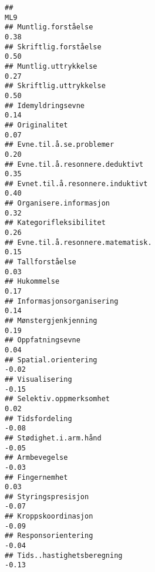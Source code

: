 \documentclass[
]{article}
\begin{document}
\begin{verbatim}
##                                                                                    ML9
## Muntlig.forståelse                                                                0.38
## Skriftlig.forståelse                                                              0.50
## Muntlig.uttrykkelse                                                               0.27
## Skriftlig.uttrykkelse                                                             0.50
## Idemyldringsevne                                                                  0.14
## Originalitet                                                                      0.07
## Evne.til.å.se.problemer                                                           0.20
## Evne.til.å.resonnere.deduktivt                                                    0.35
## Evnet.til.å.resonnere.induktivt                                                   0.40
## Organisere.informasjon                                                            0.32
## Kategorifleksibilitet                                                             0.26
## Evne.til.å.resonnere.matematisk.                                                  0.15
## Tallforståelse                                                                    0.03
## Hukommelse                                                                        0.17
## Informasjonsorganisering                                                          0.14
## Mønstergjenkjenning                                                               0.19
## Oppfatningsevne                                                                   0.04
## Spatial.orientering                                                              -0.02
## Visualisering                                                                    -0.15
## Selektiv.oppmerksomhet                                                            0.02
## Tidsfordeling                                                                    -0.08
## Stødighet.i.arm.hånd                                                             -0.05
## Armbevegelse                                                                     -0.03
## Fingernemhet                                                                      0.03
## Styringspresisjon                                                                -0.07
## Kroppskoordinasjon                                                               -0.09
## Responsorientering                                                               -0.04
## Tids..hastighetsberegning                                                        -0.13

\end{verbatim}
\end{document}
